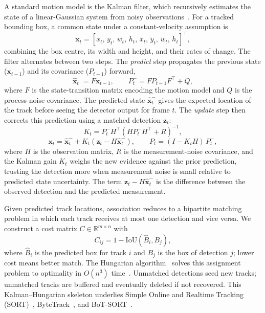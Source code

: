 A standard motion model is the Kalman filter, which 
recursively estimates the state of a linear-Gaussian system 
from noisy observations~\cite{Kalman1960}. For a tracked 
bounding box, a common state under a constant-velocity 
assumption is
\[
    \mathbf{x}_t =
    [x_t,\, y_t,\, w_t,\, h_t,\, \dot{x}_t,\, \dot{y}_t,\, \dot{w}_t,\, \dot{h}_t]^\top,
\]
combining the box centre, its width and height, and their 
rates of change. The filter alternates between two steps. 
The \emph{predict} step propagates the previous state (\({\mathbf{x}}_{t-1}\)) and 
its covariance (\(P_{t-1}\)) forward,
\begin{equation}
    \hat{\mathbf{x}}_t^{-} = F\mathbf{x}_{t-1},
    \qquad
    P_t^{-} = FP_{t-1}F^\top + Q,
    \label{eq:kalman_predict}
\end{equation}
where \(F\) is the state-transition matrix encoding the 
motion model and \(Q\) is the process-noise covariance. The predicted state 
\(\hat{\mathbf{x}}_t^{-}\) gives the expected location of 
the track before seeing the detector output for frame \(t\). The 
\emph{update} step then corrects this prediction using a 
matched detection \(\mathbf{z}_t\):
\begin{equation}
    K_t = P_t^{-} H^\top \!\left(H P_t^{-} H^\top + R\right)^{-1},
    \label{eq:kalman_gain}
\end{equation}
\begin{equation}
    \mathbf{x}_t =
    \hat{\mathbf{x}}_t^{-}
    + K_t\!\left(\mathbf{z}_t - H\hat{\mathbf{x}}_t^{-}\right),
    \qquad
    P_t = (I - K_t H)\,P_t^{-},
    \label{eq:kalman_update}
\end{equation}
where \(H\) is the observation matrix, \(R\) is the 
measurement-noise covariance, and the Kalman gain \(K_t\) 
weighs the new evidence against the prior prediction, 
trusting the detection more when measurement noise is small 
relative to predicted state uncertainty. The term \(\mathbf{z}_t - H\hat{\mathbf{x}}_t^{-}\) is the difference between the observed detection and the predicted measurement.

Given predicted track locations, association reduces to a 
bipartite matching problem in which each track receives at 
most one detection and vice versa. We construct a cost 
matrix \(C \in \mathbb{R}^{m \times n}\) with
\begin{equation}
    C_{ij} = 1 - \mathrm{IoU}(\hat{B}_i, B_j),
    \label{eq:tracking_iou_cost}
\end{equation}
where \(\hat{B}_i\) is the predicted box for track \(i\) and 
\(B_j\) is the box of detection \(j\); lower cost means 
better match. The Hungarian algorithm~\cite{Kuhn1955} solves this assignment 
problem to optimality in \(O(n^3)\) 
time~\cite{EdmondsKarp1972}. Unmatched detections seed new tracks; 
unmatched tracks are buffered and eventually deleted if not 
recovered. This Kalman--Hungarian skeleton underlies 
Simple Online and Realtime Tracking (SORT)~\cite{Bewley2016SORT}, ByteTrack~\cite{ByteTrack}, and
BoT-SORT~\cite{BoTSORT}.

